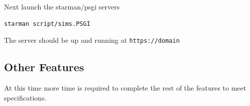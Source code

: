 \documentclass{journal}
\begin{document}
Next launch the starman/psgi servers
\begin{verbatim}
starman script/sims.PSGI
\end{verbatim}

The server should be up and running at \verb+https://domain+

\subsection{Other Features}

At this time more time is required to complete the rest of the features to meet specifications.  

\newpage



\newpage 
 
\end{document}
